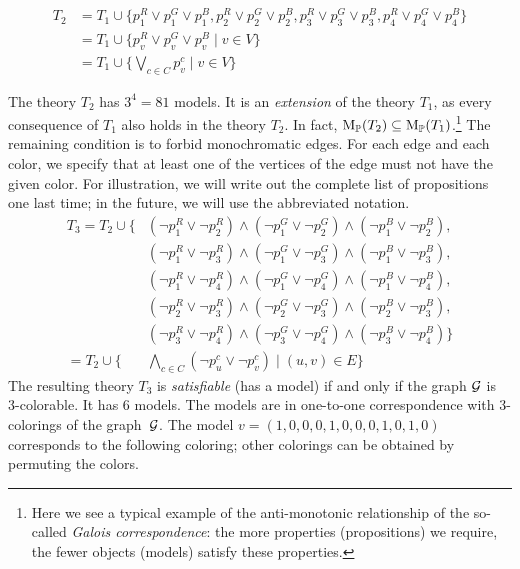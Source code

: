 \begin{align*}
T_2 &= T_1 \cup \{p_1^R \lor p_1^G \lor p_1^B, p_2^R \lor p_2^G \lor p_2^B, p_3^R \lor p_3^G \lor p_3^B, p_4^R \lor p_4^G \lor p_4^B\} \\
    &= T_1 \cup \{ p_v^R \lor p_v^G \lor p_v^B \mid v \in V \} \\
    &= T_1 \cup \{\bigvee_{c \in C} p_v^c \mid v \in V \}  
\end{align*}

The theory \( T_2 \) has \(3^4 = 81\) models. It is an \emph{extension} of the theory \( T_1 \), as every consequence of \( T_1 \) also holds in the theory \( T_2 \). In fact, \( \operatorname{M}_\mathbb{P}(T_2) \subseteq \operatorname{M}_\mathbb{P}(T_1) \).\footnote{Here we see a typical example of the anti-monotonic relationship of the so-called \emph{Galois correspondence}: the more properties (propositions) we require, the fewer objects (models) satisfy these properties.} The remaining condition is to forbid monochromatic edges. For each edge and each color, we specify that at least one of the vertices of the edge must not have the given color. For illustration, we will write out the complete list of propositions one last time; in the future, we will use the abbreviated notation.
\begin{align*}
    T_3 = T_2 \cup \{ & (\neg p_1^R \lor \neg p_2^R) \land (\neg p_1^G \lor \neg p_2^G) \land (\neg p_1^B \lor \neg p_2^B),\\
    & (\neg p_1^R \lor \neg p_3^R) \land (\neg p_1^G \lor \neg p_3^G) \land (\neg p_1^B \lor \neg p_3^B),\\
    & (\neg p_1^R \lor \neg p_4^R) \land (\neg p_1^G \lor \neg p_4^G) \land (\neg p_1^B \lor \neg p_4^B),\\
    & (\neg p_2^R \lor \neg p_3^R) \land (\neg p_2^G \lor \neg p_3^G) \land (\neg p_2^B \lor \neg p_3^B),\\
    & (\neg p_3^R \lor \neg p_4^R) \land (\neg p_3^G \lor \neg p_4^G) \land (\neg p_3^B \lor \neg p_4^B)\} \\  
= T_2 \cup \{ &\bigwedge_{c \in C} 
(\neg p_u^c \lor \neg p_v^c) \mid (u, v) \in E \}
\end{align*}
The resulting theory \( T_3 \) is \emph{satisfiable} (has a model) if and only if the graph \( \mathcal{G} \) is 3-colorable. It has 6 models. The models are in one-to-one correspondence with 3-colorings of the graph~\( \mathcal{G} \). The model \( v = (1,0,0,0,1,0,0,0,1,0,1,0) \) corresponds to the following coloring; other colorings can be obtained by permuting the colors.
\begin{center}
\end{center}

